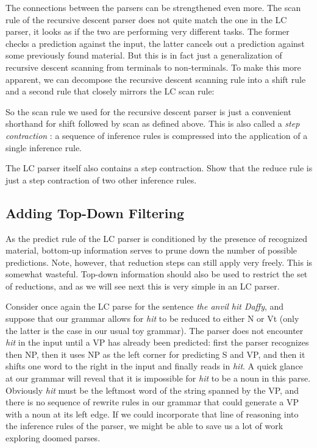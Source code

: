 The connections between the parsers can be strengthened even more.
The scan rule of the recursive descent parser does not quite match the one in the LC parser, it looks as if the two are performing very different tasks.
The former checks a prediction against the input, the latter cancels out a prediction against some previously found material.
But this is in fact just a generalization of recursive descent scanning from terminals to non-terminals.
To make this more apparent, we can decompose the recursive descent scanning rule into a shift rule and a second rule that closely mirrors the LC scan rule:
%
\begin{prooftree}
\end{prooftree}
%
\begin{prooftree}
\end{prooftree}
%
So the scan rule we used for the recursive descent parser is just a convenient shorthand for shift followed by scan as defined above.
This is also called a \emph{step contraction} \citep{Sikkel97}: a sequence of inference rules is compressed into the application of a single inference rule.

\begin{exercise}
    The LC parser itself also contains a step contraction.
    Show that the reduce rule is just a step contraction of two other inference rules.
\end{exercise}

\subsection{Adding Top-Down Filtering}
\label{sub:LC_TopDownFilter}
As the predict rule of the LC parser is conditioned by the presence of recognized material, bottom-up information serves to prune down the number of possible predictions.
Note, however, that reduction steps can still apply very freely.
This is somewhat wasteful.
Top-down information should also be used to restrict the set of reductions, and as we will see next this is very simple in an LC parser.

Consider once again the LC parse for the sentence \emph{the anvil hit Daffy}, and suppose that our grammar allows for \emph{hit} to be reduced to either N or Vt (only the latter is the case in our usual toy grammar).
The parser does not encounter \emph{hit} in the input until a VP has already been predicted: first the parser recognizes then NP, then it uses NP as the left corner for predicting S and VP, and then it shifts one word to the right in the input and finally reads in \emph{hit}.
A quick glance at our grammar will reveal that it is impossible for \emph{hit} to be a noun in this parse.
Obviously \emph{hit} must be the leftmost word of the string spanned by the VP, and there is no sequence of rewrite rules in our grammar that could generate a VP with a noun at its left edge.
If we could incorporate that line of reasoning into the inference rules of the parser, we might be able to save us a lot of work exploring doomed parses.

